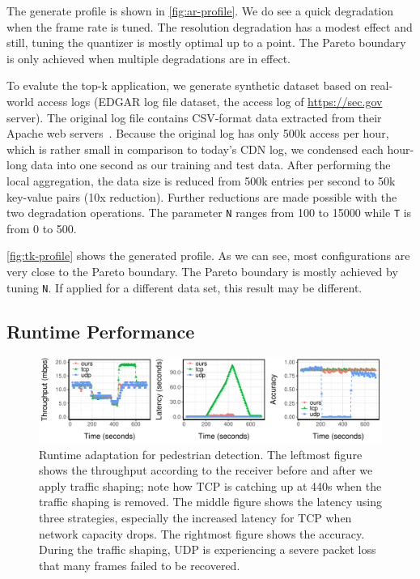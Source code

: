 The generate profile is shown in \autoref{fig:ar-profile}. We do see a quick
degradation when the frame rate is tuned. The resolution degradation has a
modest effect and still, tuning the quantizer is mostly optimal up to a
point. The Pareto boundary is only achieved when multiple degradations are in
effect.

 To evalute the top-k application, we generate synthetic dataset
based on real-world access logs (EDGAR log file dataset, the access log of
\url{https://sec.gov} server). The original log file contains CSV-format data
extracted from their Apache web servers~\cite{edgarlog}. Because the original
log has only 500k access per hour, which is rather small in comparison to
today's CDN log, we condensed each hour-long data into one second as our
training and test data. After performing the local aggregation, the data size is
reduced from 500k entries per second to 50k key-value pairs (10x reduction).
Further reductions are made possible with the two degradation operations. The
parameter \texttt{N} ranges from 100 to 15000 while \texttt{T} is from 0 to 500.

\autoref{fig:tk-profile} shows the generated profile. As we can see, most
configurations are very close to the Pareto boundary. The Pareto boundary is
mostly achieved by tuning \texttt{N}. If applied for a different data set, this
result may be different.

\subsection{Runtime Performance}
\label{sec:runtime-performance}

\begin{figure}
  \centering
  \includegraphics[width=\textwidth]{figures/ped-runtime-horizontal.pdf}
  \caption{Runtime adaptation for pedestrian detection. The leftmost figure
    shows the throughput according to the receiver before and after we apply
    traffic shaping; note how TCP is catching up at 440s when the traffic
    shaping is removed. The middle figure shows the latency using three
    strategies, especially the increased latency for TCP when network capacity
    drops. The rightmost figure shows the accuracy. During the traffic shaping,
    UDP is experiencing a severe packet loss that many frames failed to be
    recovered.}
  \label{fig:ped-runtime}
\end{figure}

